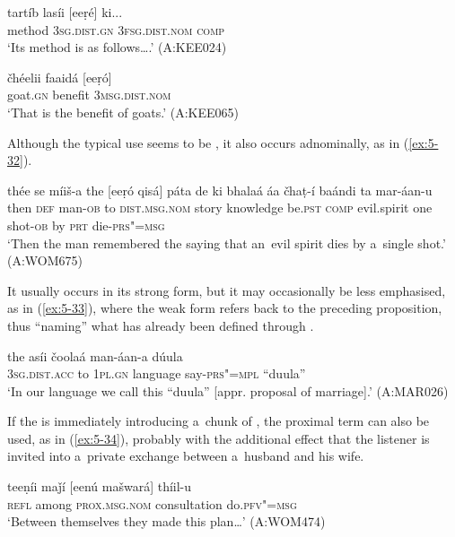 \begin{exe}
\ex
\label{ex:5-30}
\gll tartíb lasíi [eeṛé] ki...\\
method \textsc{3sg}.\textsc{dist.gn} \textsc{3fsg}.\textsc{dist.nom} \textsc{comp}\\
\glt `Its method is as follows{\ldots}.' (A:KEE024)

\ex
\label{ex:5-31}
\gll čhéelii faaidá [eeṛó]\\
goat.\textsc{gn} benefit \textsc{3msg}.\textsc{dist.nom}\\
\glt `That is the benefit of goats.' (A:KEE065)
\end{exe}
Although the typical use seems to be , it also occurs adnominally, as in (\ref{ex:5-32}).
\begin{exe}
\ex
\label{ex:5-32}
\gll thée se míiš-a the [eeṛó qisá] páta de ki bhalaá áa čhaṭ-í baándi ta mar-áan-u\\
then \textsc{def} man-\textsc{ob} to \textsc{dist.msg.nom} story knowledge be.\textsc{pst} \textsc{comp} evil.spirit one shot-\textsc{ob} by \textsc{prt} die-\textsc{prs"=msg}\\
\glt `Then the man remembered the saying that an~evil spirit dies by a~single shot.' (A:WOM675)
\end{exe}
It usually occurs in its strong form, but it may occasionally be less emphasised, as in (\ref{ex:5-33}), where the weak form refers back to the preceding proposition, thus ``naming'' what has already been defined through .
\begin{exe}
\ex
\label{ex:5-33}
\gll [ṛas] the asíi čoolaá man-áan-a dúula\\
\textsc{3sg}.\textsc{dist.acc} to \textsc{1pl.gn} language say-\textsc{prs"=mpl} ``duula''\\
\glt `In our language we call this ``duula'' [appr. proposal of marriage].' (A:MAR026)
\end{exe}
If the  is immediately introducing a~chunk of , the proximal term can also be used, as in (\ref{ex:5-34}), probably with the additional effect that the listener is invited into a~private exchange between a~husband and his wife.
\begin{exe}
\ex
\label{ex:5-34}
\gll teeṇíi maǰí [eenú mašwará] thíil-u \\
\textsc{refl} among \textsc{prox.msg.nom} consultation do.\textsc{pfv"=msg}\\
\glt `Between themselves they made this plan{\ldots}' (A:WOM474)
\end{exe}
